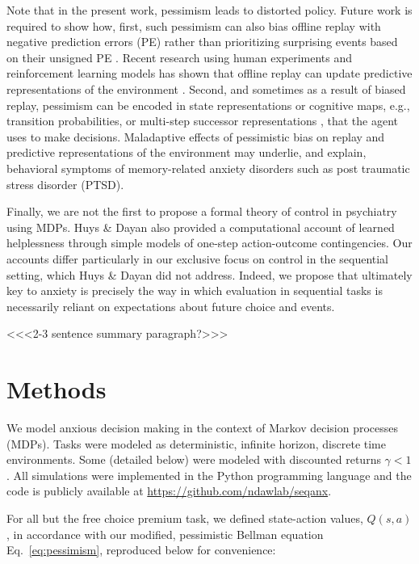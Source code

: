 \documentclass[11pt]{article} %
\begin{document}
Note that in the present work, pessimism leads to distorted policy. Future work is required to show how, first, such pessimism can also bias offline replay with negative prediction errors (PE) rather than prioritizing surprising events based on their unsigned PE \citep{momennejad_offline_2018}. Recent research using human experiments and reinforcement learning models has shown that offline replay can update predictive representations of the environment \citep{momennejad_successor_2017; russek_predictive_2017}. Second, and sometimes as a result of biased replay, pessimism can be encoded in state representations or cognitive maps, e.g., transition probabilities, or multi-step successor representations \citep{momennejad_successor_2017}, that the agent uses to make decisions. Maladaptive effects of pessimistic bias on replay and predictive representations of the environment may underlie, and explain, behavioral symptoms of memory-related anxiety disorders such as post traumatic stress disorder (PTSD). 

Finally, we are not the first to propose a formal theory of control in psychiatry using MDPs. Huys \& Dayan \cite{HuysDayan2009} also provided a computational account of learned helplessness through simple models of one-step action-outcome contingencies. Our accounts differ particularly in our exclusive focus on control in the sequential setting, which Huys \& Dayan did not address. Indeed, we propose that ultimately key to anxiety is precisely the way in which evaluation in sequential tasks is necessarily reliant on expectations about future choice and events.


<<<2-3 sentence summary paragraph?>>>


\section{Methods}

We model anxious decision making in the context of Markov decision processes (MDPs). Tasks were modeled as deterministic, infinite horizon, discrete time environments. Some (detailed below) were modeled with discounted returns $\gamma < 1$. All simulations were implemented in the Python programming language and the code is publicly available at \url{https://github.com/ndawlab/seqanx}.

For all but the free choice premium task, we defined state-action values, $Q(s,a)$, in accordance with our modified, pessimistic Bellman equation Eq.~\ref{eq:pessimism}, reproduced below for convenience:
\end{document}

